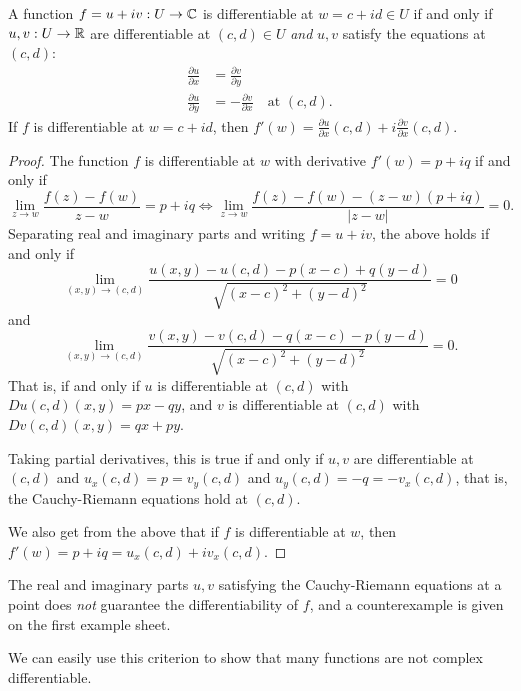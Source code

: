 \documentclass[a4paper]{scrartcl}
\begin{document}
\begin{theorem}
    A function $f = u + iv: U \rightarrow \mathbb{C}$ is differentiable at $w = c + id \in U$ if and only if $u, v : U \rightarrow \mathbb{R}$ are differentiable at $(c, d) \in U$ \emph{and} $u, v$ satisfy the  equations at $(c, d)$:
    \begin{align*}
        \frac{\partial u}{\partial x} &= \frac{\partial v}{\partial y} \\
        \frac{\partial u}{\partial y} &= - \frac{\partial v}{\partial x} \quad \text{at }(c, d).
    \end{align*}
    If $f$ is differentiable at $w = c + id$, then $f'(w) = \frac{\partial u}{\partial x}(c, d) + i \frac{\partial v}{\partial x} (c, d)$.
\end{theorem}
\begin{proof}
    The function $f$ is differentiable at $w$ with derivative $f'(w) = p + iq$ if and only if
    $$
    \lim _{z \rightarrow w} \frac{f(z)-f(w)}{z-w}=p+i q \iff \lim _{z \rightarrow w} \frac{f(z)-f(w)-(z-w)(p+i q)}{|z-w|}=0.
    $$
    Separating real and imaginary parts and writing $f = u + iv$, the above holds if and only if
    $$
    \lim _{(x, y) \rightarrow(c, d)} \frac{u(x, y)-u(c, d)-p(x-c)+q(y-d)}{\sqrt{(x-c)^{2}+(y-d)^{2}}}=0
    $$
    and
    $$
    \lim _{(x, y) \rightarrow(c, d)} \frac{v(x, y)-v(c, d)-q(x-c)-p(y-d)}{\sqrt{(x-c)^{2}+(y-d)^{2}}}=0.
    $$
    That is, if and only if $u$ is differentiable at $(c, d)$ with $Du(c, d)(x, y) = px - qy$, and $v$ is differentiable at $(c, d)$ with $Dv(c, d)(x, y) = qx + py$. 

    Taking partial derivatives, this is true if and only if $u, v$ are differentiable at $(c, d)$ and $u_x(c, d) = p = v_y(c, d)$ and $u_y(c, d) = -q = -v_x(c, d)$, that is, the Cauchy-Riemann equations hold at $(c, d)$.

    We also get from the above that if $f$ is differentiable at $w$, then $f'(w) = p + iq = u_x(c, d) + i v_x(c, d)$.
\end{proof}

\begin{remark}[Warning]
    The real and imaginary parts
    $u, v$ satisfying the Cauchy-Riemann equations at a point does \emph{not} guarantee the differentiability of $f$, and a counterexample is given on the first example sheet.
\end{remark}

We can easily use this criterion to show that many functions are not complex differentiable.
\end{document}

